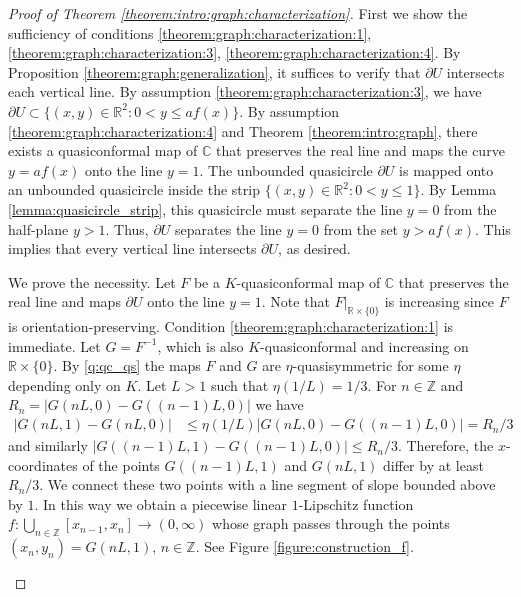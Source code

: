 \documentclass[letterpaper]{amsart}
\theoremstyle{plain}
\theoremstyle{definition}
\theoremstyle{remark}
\numberwithin{equation}{section}
\numberwithin{theorem}{section}
\newcommand{\R}{\mathbb R}
\newcommand{\C}{\mathbb C}
\newcommand{\Z}{\mathbb Z}
\begin{document}
\begin{proof}[Proof of Theorem \ref{theorem:intro:graph:characterization}]
First we show the sufficiency of conditions \ref{theorem:graph:characterization:1}, \ref{theorem:graph:characterization:3}, \ref{theorem:graph:characterization:4}. By Proposition \ref{theorem:graph:generalization}, it suffices to verify that $\partial U$ intersects each vertical line. By assumption \ref{theorem:graph:characterization:3}, we have $\partial U\subset \{(x,y)\in \R^2: 0< y\leq  af(x)\}$. By assumption \ref{theorem:graph:characterization:4} and Theorem \ref{theorem:intro:graph}, there exists a quasiconformal map of $\C$ that preserves the real line and maps the curve $y=af(x)$ onto the line $y=1$. The unbounded quasicircle $\partial U$ is mapped onto an unbounded quasicircle inside the strip $\{(x,y)\in \R^2: 0<y\leq 1\}$. By Lemma \ref{lemma:quasicircle_strip}, this quasicircle must separate the line $y=0$ from the half-plane $y>1$. Thus, $\partial U$ separates the line $y=0$ from the set $y>af(x)$. This implies that every vertical line intersects $\partial U$, as desired. 

We prove the necessity. Let $F$ be a $K$-quasiconformal map of $\C$ that  preserves the real line and maps $\partial U$ onto the line $y=1$. Note that $F|_{\R\times \{0\}}$ is increasing since $F$ is orientation-preserving. Condition \ref{theorem:graph:characterization:1} is immediate. Let $G=F^{-1}$, which is also $K$-quasiconformal and increasing on $\R\times \{0\}$. By \ref{q:qc_qs} the maps $F$ and $G$ are $\eta$-quasisymmetric for some $\eta$ depending only on $K$. Let $L>1$ such that $\eta(1/L)=1/3$. For $n\in \Z$ and $R_n=|G(nL,0)-G((n-1)L,0)|$ we have 
\begin{align}\label{graph:i}
|G(nL,1)-G(nL,0)|&\leq \eta(1/L) |G(nL,0)-G((n-1)L,0)|=R_n/3
\end{align}
and similarly $|G((n-1)L,1)-G((n-1)L,0)|\leq R_n/3$. 
Therefore, the $x$-coordinates of the points $G((n-1)L,1)$ and $G(nL,1)$ differ by at least $R_n/3$. We connect these two points with a line segment of slope bounded above by $1$. In this way we obtain a piecewise linear $1$-Lipschitz function $f\colon \bigcup_{n\in \Z}[x_{n-1},x_n]\to (0,\infty)$ whose graph passes through the points $(x_n,y_n)=G(nL,1)$, $n\in \Z$. See Figure \ref{figure:construction_f}.

\begin{figure}
\end{figure}
\end{proof}
\end{document}
